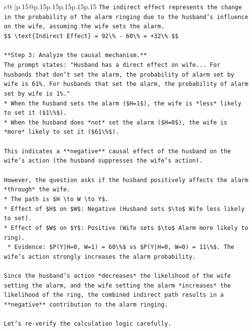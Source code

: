 \documentclass{article}
\begin{document}
{\begin{supertabular}{c@{$\;$}|p{.15\linewidth}@{}p{.15\linewidth}p{.15\linewidth}p{.15\linewidth}p{.15\linewidth}p{.15\linewidth}}
{{{\texttt{The indirect effect represents the change in the probability of the alarm ringing due to the husband's influence on the wife, assuming the wife sets the alarm.} \\
\texttt{\$\$ \textbackslash{}text\{Indirect Effect\} = 92\textbackslash{}\% {-} 60\textbackslash{}\% = +32\textbackslash{}\% \$\$} \\
\\ 
\texttt{**Step 3: Analyze the causal mechanism.**} \\
\texttt{The prompt states: "Husband has a direct effect on wife... For husbands that don't set the alarm, the probability of alarm set by wife is 61\%. For husbands that set the alarm, the probability of alarm set by wife is 1\%."} \\
\texttt{*   When the husband sets the alarm (\$H=1\$), the wife is *less* likely to set it (\$1\textbackslash{}\%\$).} \\
\texttt{*   When the husband does *not* set the alarm (\$H=0\$), the wife is *more* likely to set it (\$61\textbackslash{}\%\$).} \\
\\ 
\texttt{This indicates a **negative** causal effect of the husband on the wife's action (the husband suppresses the wife's action).} \\
\\ 
\texttt{However, the question asks if the husband positively affects the alarm *through* the wife.} \\
\texttt{*   The path is \$H \textbackslash{}to W \textbackslash{}to Y\$.} \\
\texttt{*   Effect of \$H\$ on \$W\$: Negative (Husband sets \$\textbackslash{}to\$ Wife less likely to set).} \\
\texttt{*   Effect of \$W\$ on \$Y\$: Positive (Wife sets \$\textbackslash{}to\$ Alarm more likely to ring).} \\
\texttt{    *   Evidence: \$P(Y|H=0, W=1) = 60\textbackslash{}\%\$ vs \$P(Y|H=0, W=0) = 11\textbackslash{}\%\$. The wife's action strongly increases the alarm probability.} \\
\\ 
\texttt{Since the husband's action *decreases* the likelihood of the wife setting the alarm, and the wife setting the alarm *increases* the likelihood of the ring, the combined indirect path results in a **negative** contribution to the alarm ringing.} \\
\\ 
\texttt{Let's re{-}verify the calculation logic carefully.} \\
}}}
\end{supertabular}}
\end{document}
